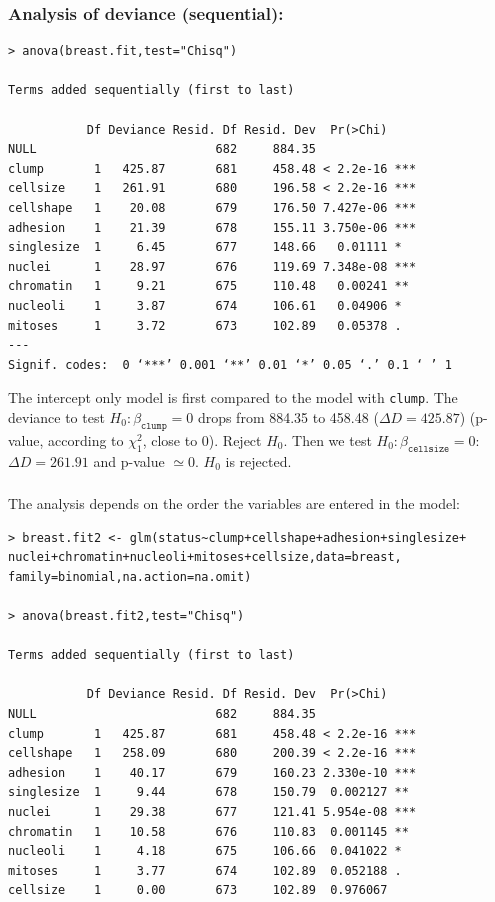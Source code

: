 \documentclass{beamer}
\begin{document}
\begin{frame}[fragile]
\frametitle{Analysis of deviance (sequential):}

{\tiny
\begin{verbatim}
> anova(breast.fit,test="Chisq")

Terms added sequentially (first to last)

           Df Deviance Resid. Df Resid. Dev  Pr(>Chi)    
NULL                         682     884.35              
clump       1   425.87       681     458.48 < 2.2e-16 ***
cellsize    1   261.91       680     196.58 < 2.2e-16 ***
cellshape   1    20.08       679     176.50 7.427e-06 ***
adhesion    1    21.39       678     155.11 3.750e-06 ***
singlesize  1     6.45       677     148.66   0.01111 *  
nuclei      1    28.97       676     119.69 7.348e-08 ***
chromatin   1     9.21       675     110.48   0.00241 ** 
nucleoli    1     3.87       674     106.61   0.04906 *  
mitoses     1     3.72       673     102.89   0.05378 .  
---
Signif. codes:  0 ‘***’ 0.001 ‘**’ 0.01 ‘*’ 0.05 ‘.’ 0.1 ‘ ’ 1
\end{verbatim}
}

The intercept only model is first compared to the model
with \texttt{clump}. The deviance to test $H_0:
\beta_{\texttt{clump}}=0$ drops from 884.35 to 458.48 ($\Delta D = 425.87$) (p-value, according to $\chi^2_1$, close to 0). Reject $H_0$.
Then we test $H_0: \beta_{\texttt{cellsize}}=0$: $\Delta D = 261.91$ and p-value
$\simeq 0$.  $H_0$ is rejected.
\end{frame}


\begin{frame}[fragile]
\frametitle{}
The analysis depends on the order the variables are entered in the model:

{\scriptsize
\begin{verbatim}
> breast.fit2 <- glm(status~clump+cellshape+adhesion+singlesize+
nuclei+chromatin+nucleoli+mitoses+cellsize,data=breast,
family=binomial,na.action=na.omit)

> anova(breast.fit2,test="Chisq")

Terms added sequentially (first to last)

           Df Deviance Resid. Df Resid. Dev  Pr(>Chi)    
NULL                         682     884.35              
clump       1   425.87       681     458.48 < 2.2e-16 ***
cellshape   1   258.09       680     200.39 < 2.2e-16 ***
adhesion    1    40.17       679     160.23 2.330e-10 ***
singlesize  1     9.44       678     150.79  0.002127 ** 
nuclei      1    29.38       677     121.41 5.954e-08 ***
chromatin   1    10.58       676     110.83  0.001145 ** 
nucleoli    1     4.18       675     106.66  0.041022 *  
mitoses     1     3.77       674     102.89  0.052188 .  
cellsize    1     0.00       673     102.89  0.976067    
\end{verbatim}
}
\end{frame}
\end{document}
